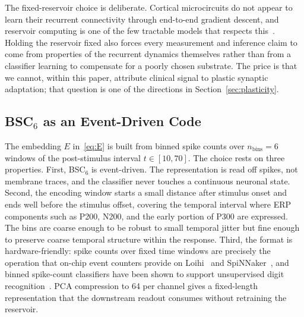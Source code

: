 \documentclass[journal]{IEEEtran}
\begin{document}
The fixed-reservoir choice is deliberate. Cortical microcircuits do not appear to learn their recurrent connectivity through end-to-end gradient descent, and reservoir computing is one of the few tractable models that respects this~\cite{lukosevicius2009reservoir}. Holding the reservoir fixed also forces every measurement and inference claim to come from properties of the recurrent dynamics themselves rather than from a classifier learning to compensate for a poorly chosen substrate. The price is that we cannot, within this paper, attribute clinical signal to plastic synaptic adaptation; that question is one of the directions in Section~\ref{sec:plasticity}.

\subsection{BSC$_6$ as an Event-Driven Code}
The embedding $E$ in~\eqref{eq:E} is built from binned spike counts over $n_{\text{bins}}=6$ windows of the post-stimulus interval $t\in[10,70]$. The choice rests on three properties. First, BSC$_6$ is event-driven. The representation is read off spikes, not membrane traces, and the classifier never touches a continuous neuronal state. Second, the encoding window starts a small distance after stimulus onset and ends well before the stimulus offset, covering the temporal interval where ERP components such as P200, N200, and the early portion of P300 are expressed. The bins are coarse enough to be robust to small temporal jitter but fine enough to preserve coarse temporal structure within the response. Third, the format is hardware-friendly: spike counts over fixed time windows are precisely the operation that on-chip event counters provide on Loihi~\cite{davies2018loihi} and SpiNNaker~\cite{furber2014spinnaker}, and binned spike-count classifiers have been shown to support unsupervised digit recognition~\cite{diehl2015unsupervised}. PCA compression to 64 per channel gives a fixed-length representation that the downstream readout consumes without retraining the reservoir.
\end{document}
